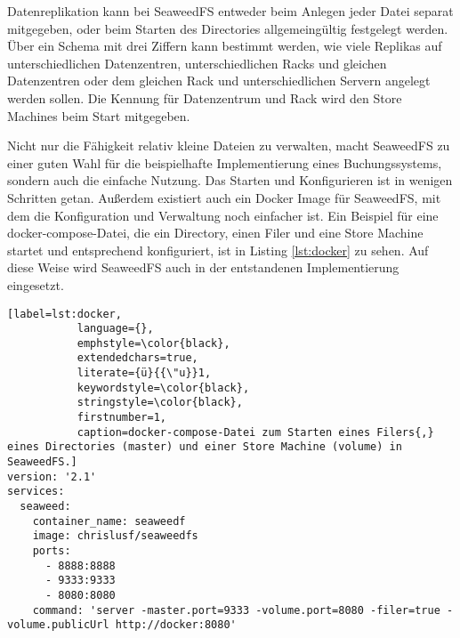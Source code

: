 \documentclass[12pt,oneside,a4paper,parskip]{scrbook}
\begin{document}
Datenreplikation kann bei SeaweedFS entweder beim Anlegen jeder Datei separat mitgegeben, oder beim Starten des Directories allgemeingültig festgelegt werden. Über ein Schema mit drei Ziffern kann bestimmt werden, wie viele Replikas auf unterschiedlichen Datenzentren, unterschiedlichen Racks und gleichen Datenzentren oder dem gleichen Rack und unterschiedlichen Servern angelegt werden sollen. Die Kennung für Datenzentrum und Rack wird den Store Machines beim Start mitgegeben.

Nicht nur die Fähigkeit relativ kleine Dateien zu verwalten, macht SeaweedFS zu einer guten Wahl für die beispielhafte Implementierung eines Buchungssystems, sondern auch die einfache Nutzung. Das Starten und Konfigurieren ist in wenigen Schritten getan. Außerdem existiert auch ein Docker Image für SeaweedFS, mit dem die Konfiguration und Verwaltung noch einfacher ist. Ein Beispiel für eine docker-compose-Datei, die ein Directory, einen Filer und eine Store Machine startet und entsprechend konfiguriert, ist in Listing \ref{lst:docker} zu sehen. Auf diese Weise wird SeaweedFS auch in der entstandenen Implementierung eingesetzt.

\begin{lstlisting}[label=lst:docker,
           language={},
           emphstyle=\color{black},
           extendedchars=true,
           literate={ü}{{\"u}}1,
           keywordstyle=\color{black},
           stringstyle=\color{black},
           firstnumber=1,
           caption=docker-compose-Datei zum Starten eines Filers{,} eines Directories (master) und einer Store Machine (volume) in SeaweedFS.]          
version: '2.1'
services:
  seaweed:
    container_name: seaweedf
    image: chrislusf/seaweedfs
    ports:
      - 8888:8888
      - 9333:9333
      - 8080:8080
    command: 'server -master.port=9333 -volume.port=8080 -filer=true -volume.publicUrl http://docker:8080'
\end{lstlisting}
\end{document}
